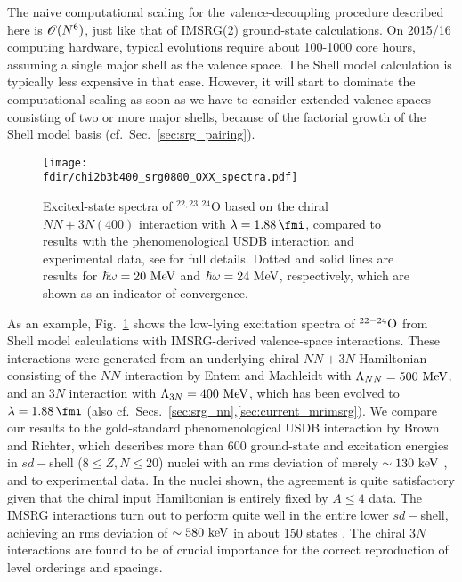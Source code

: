 The naive computational scaling for the valence-decoupling procedure 
described here is $\OC(N^6)$, just like that of IMSRG(2) ground-state 
calculations. On 2015/16 computing hardware, typical evolutions require
about 100-1000 core hours, assuming a single major shell as the valence
space. The Shell model calculation is typically less expensive in that
case. However, it will start to dominate the computational scaling as 
soon as we have to consider extended valence spaces consisting of two
or more major shells, because of the factorial growth of 
the Shell model basis (cf.~Sec.~\ref{sec:srg_pairing}).

\begin{figure}[t]
  \begin{center}
    \texttt{[image: \\fdir/chi2b3b400\_srg0800\_OXX\_spectra.pdf]}
  \end{center}
\caption{Excited-state spectra of $^{22,23,24}$O based on the chiral
$NN+3N(400)$ interaction with $\lambdaSRG=1.88\,\fmi$, compared to 
results with the phenomenological USDB interaction \cite{Brown:2006fk}
and experimental data, see \cite{Bogner:2014tg,Hergert:2017kx} for 
full details. Dotted and solid lines are results for $\hbar \omega=20\,\MeV$
and $\hbar \omega=24\,\MeV$, respectively, which are shown as an indicator
of convergence. \label{fig:Ospectra}}
\end{figure}

As an example, Fig.~\ref{fig:Ospectra} shows the low-lying excitation 
spectra of $\nuc{O}{22-24}$ from Shell model calculations with IMSRG-derived
valence-space interactions. These interactions were generated from an 
underlying chiral $NN+3N$ Hamiltonian consisting of the
\NNNLO{} $NN$ interaction by Entem and Machleidt with $\Lambda_{NN}=500\,\MeV$,
and an \NNLO{} $3N$ interaction with $\Lambda_{3N}=400\,\MeV$, which has
been evolved to $\lambdaSRG=1.88\,\fmi$ \cite{Entem:2003th,Machleidt:2011bh,Gazit:2009qf,Roth:2011kx}
(also cf.~Secs.~\ref{sec:srg_nn},\ref{sec:current_mrimsrg}). We compare
our results to the gold-standard phenomenological USDB interaction by
Brown and Richter, which describes more than 600
ground-state and excitation energies in $sd-$shell ($8\leq Z,N\leq 20$) 
nuclei with an rms deviation of merely $\sim130\,\keV$ \cite{Brown:2006fk},
and to experimental data. In the nuclei shown, the agreement is quite
satisfactory given that the chiral input Hamiltonian is entirely fixed
by $A\leq4$ data. The IMSRG interactions turn out to perform quite well 
in the entire lower $sd-$shell, achieving an rms deviation of $\sim580\,\keV$
in about 150 states \cite{Stroberg:2016fk,Hergert:2017kx}. The chiral 
$3N$ interactions are found to be of crucial importance for the correct
reproduction of level orderings and spacings. 

